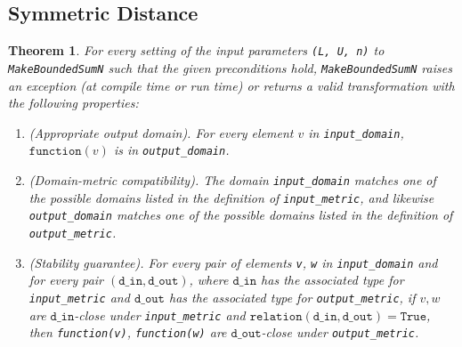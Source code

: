 \documentclass[11pt,a4paper]{article}
\newtheorem{theorem}{Theorem}
\theoremstyle{definition}
\newcommand{\din}{\texttt{d\_in}}
\newcommand{\dout}{\texttt{d\_out}}
\newcommand{\True}{\texttt{True}}
\newcommand{\function}{\texttt{function}}
\begin{document}
\subsection{Symmetric Distance}
\begin{theorem}
    For every setting of the input parameters \texttt{(L, U, n)} to \texttt{MakeBoundedSumN} such that the given preconditions hold, \texttt{MakeBoundedSumN} raises an exception (at compile time or run time) or returns a valid transformation with the following properties:
    \begin{enumerate}
        \item \textup{(Appropriate output domain).} For every element $v$ in \texttt{input\_domain}, $\function(v)$ is in \texttt{output\_domain}.
        
        \item \textup{(Domain-metric compatibility).} The domain \texttt{input\_domain} matches one of the possible domains listed in the definition of \texttt{input\_metric}, and likewise \texttt{output\_domain} matches one of the possible domains listed in the definition of \texttt{output\_metric}.
        
        \item \textup{(Stability guarantee).} For every pair of elements \texttt{v}, \texttt{w} in \texttt{input\_domain} and for every pair $(\din, \dout)$,  where $\din$ has the associated type for \texttt{input\_metric} and $\dout$ has the associated type for \texttt{output\_metric}, if $v,w$ are $\din$-close under \texttt{input\_metric} and $\texttt{relation}(\din, \dout) = \True$, then \texttt{function(v)}, \texttt{function(w)} are $\dout$-close under \texttt{output\_metric}.
    \end{enumerate}
\end{theorem}
\end{document}
